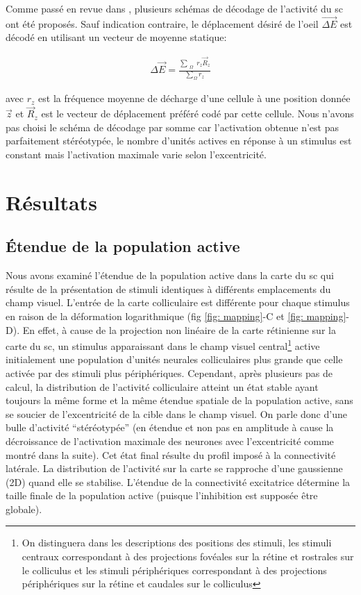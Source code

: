 Comme passé en revue dans \cite{Gandhi:2011}, plusieurs schémas de décodage de l'activité du \gls{sc} ont été proposés.  Sauf indication contraire, le déplacement désiré de l'oeil $\vec{\Delta E}$  est décodé en utilisant un vecteur de moyenne statique:

\begin{align}
  \Delta\vec{E} = \frac{\sum_{\substack{\Omega}}^{} r_z\vec{R}_z }{\sum_{\Omega}^{}r_z}
\label{sommation}
\end{align}

avec $r_z$ est la fréquence moyenne de décharge d'une cellule à une position donnée $\vec{z}$ et $\vec{R}_z$  est le vecteur de déplacement préféré codé par cette cellule. Nous n'avons pas choisi le schéma de décodage par somme car l'activation obtenue n'est pas parfaitement stéréotypée, le nombre d'unités actives en réponse à un stimulus est constant mais l'activation maximale varie selon l'excentricité. \\


\section{Résultats}

\subsection{\' Etendue de la population active}

Nous avons examiné l'étendue de la population active dans la carte du \gls{sc} qui résulte de la présentation de stimuli identiques à différents emplacements du champ visuel. L'entrée de la carte colliculaire est différente pour chaque stimulus en raison de la déformation logarithmique (fig \ref{fig: mapping}-C et \ref{fig: mapping}-D). En effet, à cause de la projection non linéaire de la carte rétinienne sur la carte du \gls{sc}, un stimulus apparaissant dans le champ visuel central\footnote{On distinguera dans les descriptions des positions des stimuli, les stimuli centraux correspondant à des projections fovéales sur la rétine et rostrales sur le colliculus et les stimuli périphériques correspondant à des projections périphériques sur la rétine et caudales sur le colliculus} active initialement une population d'unités neurales colliculaires plus grande que celle activée par des stimuli plus périphériques. Cependant, après plusieurs pas de calcul, la distribution de l'activité colliculaire atteint un état stable ayant toujours la même forme et la même étendue spatiale de la population active, sans se soucier de l'excentricité de la cible dans le champ visuel. On parle donc d'une bulle d'activité ``stéréotypée'' (en étendue et non pas en amplitude à cause la décroissance de l'activation maximale des neurones avec l'excentricité comme montré dans la suite). Cet état final résulte du profil imposé à la connectivité latérale. La distribution de l'activité sur la carte se rapproche d'une gaussienne (2D) quand elle se stabilise. L'étendue de la connectivité excitatrice détermine la taille finale de la population active (puisque l'inhibition est supposée être globale). 

